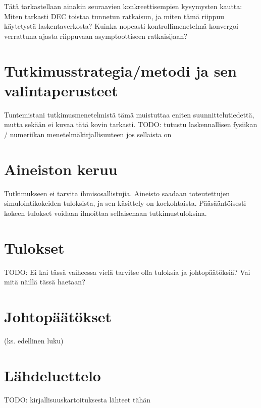 \documentclass[utf8]{gradu3}
\begin{document}
Tätä tarkastellaan ainakin seuraavien konkreettisempien kysymysten kautta:
Miten tarkasti DEC toistaa tunnetun ratkaisun,
ja miten tämä riippuu käytetystä laskentaverkosta?
Kuinka nopeasti kontrollimenetelmä konvergoi
verrattuna ajasta riippuvaan asymptoottiseen ratkaisijaan?

\chapter{Tutkimusstrategia/metodi ja sen valintaperusteet}

Tuntemistani tutkimusmenetelmistä tämä muistuttaa eniten suunnittelutiedettä,
mutta sekään ei kuvaa tätä kovin tarkasti.
TODO: tutustu laskennallisen fysiikan / numeriikan menetelmäkirjallisuuteen
jos sellaista on

\chapter{Aineiston keruu}

Tutkimukseen ei tarvita ihmisosallistujia.
Aineisto saadaan toteutettujen simulointikokeiden tuloksista,
ja sen käsittely on koekohtaista.
Pääsääntöisesti kokeen tulokset voidaan ilmoittaa sellaisenaan tutkimustuloksina.

\chapter{Tulokset}

TODO: Ei kai tässä vaiheessa vielä tarvitse olla tuloksia ja johtopäätöksiä?
Vai mitä näillä tässä haetaan?

\chapter{Johtopäätökset}

(ks. edellinen luku)

\chapter{Lähdeluettelo}

TODO: kirjallisuuskartoituksesta lähteet tähän
\end{document}

